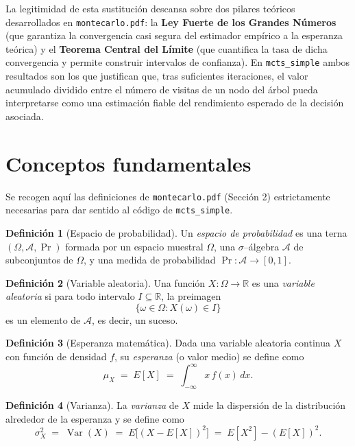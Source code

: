 \documentclass[11pt,a4paper]{article}
\theoremstyle{definition}
\newtheorem{definition}{Definición}
\begin{document}
La legitimidad de esta sustitución descansa sobre dos pilares teóricos desarrollados en \texttt{montecarlo.pdf}: la \textbf{Ley Fuerte de los Grandes Números} (que garantiza la convergencia casi segura del estimador empírico a la esperanza teórica) y el \textbf{Teorema Central del Límite} (que cuantifica la tasa de dicha convergencia y permite construir intervalos de confianza). En \texttt{mcts\_simple} ambos resultados son los que justifican que, tras suficientes iteraciones, el valor acumulado dividido entre el número de visitas de un nodo del árbol pueda interpretarse como una estimación fiable del rendimiento esperado de la decisión asociada.

\section{Conceptos fundamentales}

Se recogen aquí las definiciones de \texttt{montecarlo.pdf} (Sección 2) estrictamente necesarias para dar sentido al código de \texttt{mcts\_simple}.

\begin{definition}[Espacio de probabilidad]
Un \emph{espacio de probabilidad} es una terna $(\Omega, \mathcal{A}, \Pr)$ formada por un espacio muestral $\Omega$, una $\sigma$--álgebra $\mathcal{A}$ de subconjuntos de $\Omega$, y una medida de probabilidad $\Pr:\mathcal{A}\to[0,1]$.
\end{definition}

\begin{definition}[Variable aleatoria]
Una función $X:\Omega\to\mathbb{R}$ es una \emph{variable aleatoria} si para todo intervalo $I\subseteq\mathbb{R}$, la preimagen
\[
\{\omega\in\Omega : X(\omega)\in I\}
\]
es un elemento de $\mathcal{A}$, es decir, un suceso.
\end{definition}

\begin{definition}[Esperanza matemática]
Dada una variable aleatoria continua $X$ con función de densidad $f$, su \emph{esperanza} (o valor medio) se define como
\begin{equation}
\mu_X \;=\; E[X] \;=\; \int_{-\infty}^{\infty} x\, f(x)\, dx.
\label{eq:esperanza}
\end{equation}
\end{definition}

\begin{definition}[Varianza]
La \emph{varianza} de $X$ mide la dispersión de la distribución alrededor de la esperanza y se define como
\begin{equation}
\sigma_X^2 \;=\; \operatorname{Var}(X) \;=\; E\bigl[(X-E[X])^2\bigr] \;=\; E[X^2] - (E[X])^2.
\label{eq:varianza}
\end{equation}
\end{definition}
\end{document}
